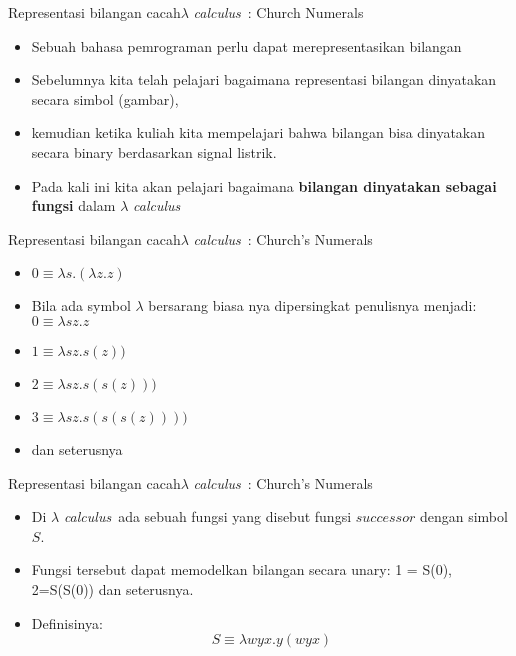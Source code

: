 \documentclass[aspectratio=1610,10pt,handout]{beamer}
\newcommand{\lc}{$\lambda$ {\it calculus}\ }
\begin{document}
\begin{frame}{Representasi bilangan cacah}{\lc: Church Numerals}

	\begin{itemize}
		\item<1-> Sebuah bahasa pemrograman perlu dapat merepresentasikan bilangan
		\item<2-> Sebelumnya kita telah pelajari bagaimana representasi bilangan dinyatakan secara simbol (gambar), \item<3-> kemudian ketika kuliah kita mempelajari bahwa bilangan bisa dinyatakan secara binary berdasarkan signal listrik.
		\item<4-> Pada kali ini kita akan pelajari bagaimana {\bf bilangan dinyatakan sebagai fungsi} dalam \lc
	\end{itemize}
\end{frame}


\begin{frame}{Representasi bilangan cacah}{\lc: Church's Numerals}

	\begin{itemize}
		\item<1-> $0 \equiv \lambda s. (\lambda z. z)$
		\item<2-> Bila ada symbol $\lambda$ bersarang biasa nya dipersingkat penulisnya menjadi:\\

		$ 0 \equiv \lambda s z. z$
		 \item<3-> $ 1 \equiv \lambda s z. s (z))$
		 \item<4-> $ 2 \equiv \lambda s z. s (s (z)))$
		 \item<5-> $ 3 \equiv \lambda s z. s (s (s (z))))$
		 \item<5-> dan seterusnya
	\end{itemize}


\end{frame}


\begin{frame}{Representasi bilangan cacah}{\lc: Church's Numerals}

	\begin{itemize}
		\item<1-> Di \lc ada sebuah fungsi yang disebut fungsi $successor$ dengan simbol $S$.

		\item<2-> Fungsi tersebut dapat memodelkan bilangan secara unary: 1 = S(0), 2=S(S(0)) dan seterusnya.

		\item<3-> Definisinya: $$ S \equiv \lambda w y x. y (wyx) $$
	\end{itemize}

\end{frame}
\end{document}
